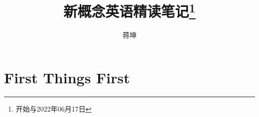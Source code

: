 \documentclass[10pt]{ctexbook}
\title{新概念英语精读笔记\footnote{开始与2022年06月17日}}
\author{蒋坤}
\begin{document}
\maketitle

\tableofcontents

\part{First Things First}


\end{document}
